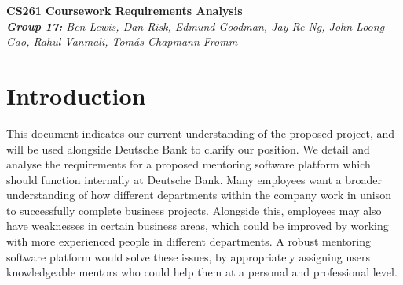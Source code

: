 \documentclass[10pt]{article}
\begin{document}
\begin{center}
    \Huge\textbf{CS261 Coursework Requirements Analysis}\\
    \vspace{2mm}
    \large{\textit{\textbf{Group 17:} Ben Lewis, Dan Risk, Edmund Goodman,
    Jay Re Ng, John-Loong Gao, Rahul Vanmali, Tomás Chapmann Fromm}}
\end{center}


\vspace{-6mm}\section{Introduction}\vspace{-2mm}
This document indicates our current understanding of the proposed project, and
will be used alongside Deutsche Bank to clarify our position. We detail and
analyse the requirements for a proposed mentoring software platform which should
function internally at Deutsche Bank. Many employees want a broader
understanding of how different departments within the company work in unison to
successfully complete business projects. Alongside this, employees may also have
weaknesses in certain business areas, which could be improved by working with
more experienced people in different departments. A robust mentoring software
platform would solve these issues, by appropriately assigning users
knowledgeable mentors who could help them at a personal and professional level.
\end{document}
